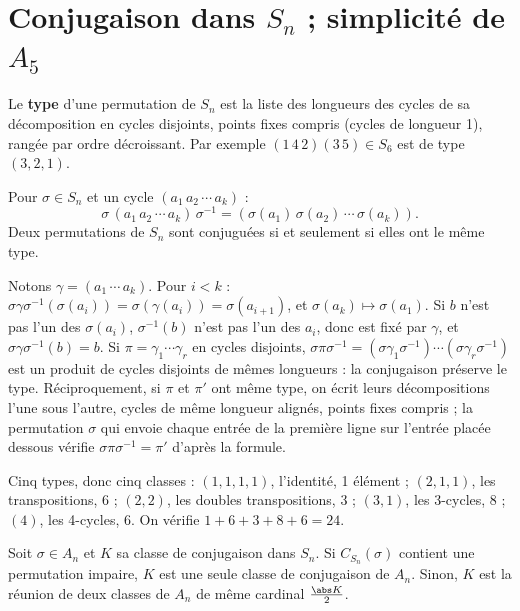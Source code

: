 \section{Conjugaison dans $S_n$ ; simplicité de $A_5$}
\begin{definition}
Le \textbf{type} d'une permutation de $S_n$ est la liste des longueurs des cycles de sa décomposition en cycles disjoints, points fixes compris (cycles de longueur 1), rangée par ordre décroissant. Par exemple $(1\,4\,2)(3\,5)\in S_6$ est de type $(3,2,1)$.
\end{definition}
\begin{proposition}\label{prop-conj-sn}
Pour $\sigma\in S_n$ et un cycle $(a_1\,a_2\,\cdots\,a_k)$ :
\[\sigma\,(a_1\,a_2\,\cdots\,a_k)\,\sigma^{-1}=(\sigma(a_1)\,\sigma(a_2)\,\cdots\,\sigma(a_k)).\]
Deux permutations de $S_n$ sont conjuguées si et seulement si elles ont le même type.
\end{proposition}
\begin{preuve}
Notons $\gamma=(a_1\,\cdots\,a_k)$. Pour $i<k$ : $\sigma\gamma\sigma^{-1}(\sigma(a_i))=\sigma(\gamma(a_i))=\sigma(a_{i+1})$, et $\sigma(a_k)\mapsto\sigma(a_1)$. Si $b$ n'est pas l'un des $\sigma(a_i)$, $\sigma^{-1}(b)$ n'est pas l'un des $a_i$, donc est fixé par $\gamma$, et $\sigma\gamma\sigma^{-1}(b)=b$. Si $\pi=\gamma_1\cdots\gamma_r$ en cycles disjoints, $\sigma\pi\sigma^{-1}=(\sigma\gamma_1\sigma^{-1})\cdots(\sigma\gamma_r\sigma^{-1})$ est un produit de cycles disjoints de mêmes longueurs : la conjugaison préserve le type. Réciproquement, si $\pi$ et $\pi'$ ont même type, on écrit leurs décompositions l'une sous l'autre, cycles de même longueur alignés, points fixes compris ; la permutation $\sigma$ qui envoie chaque entrée de la première ligne sur l'entrée placée dessous vérifie $\sigma\pi\sigma^{-1}=\pi'$ d'après la formule.
\end{preuve}
\begin{exemple}
Cinq types, donc cinq classes : $(1,1,1,1)$, l'identité, 1 élément ; $(2,1,1)$, les transpositions, 6 ; $(2,2)$, les doubles transpositions, 3 ; $(3,1)$, les 3-cycles, 8 ; $(4)$, les 4-cycles, 6. On vérifie $1+6+3+8+6=24$.
\end{exemple}
\begin{proposition}[Classes de $A_n$]\label{prop-classes-an}
Soit $\sigma\in A_n$ et $K$ sa classe de conjugaison dans $S_n$. Si $C_{S_n}(\sigma)$ contient une permutation impaire, $K$ est une seule classe de conjugaison de $A_n$. Sinon, $K$ est la réunion de deux classes de $A_n$ de même cardinal $\frac{\abs K}2$.
\end{proposition}
